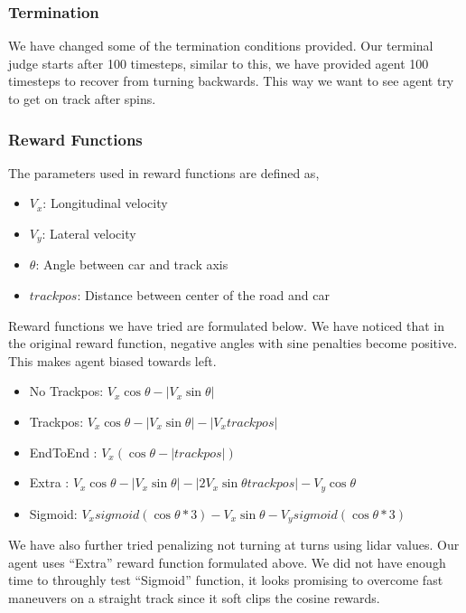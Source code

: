 \documentclass[conference]{IEEEtran}
\begin{document}
\subsubsection{Termination}
We have changed some of the termination conditions provided. Our terminal judge starts after 100 timesteps, similar to this, we have provided agent 100 timesteps to recover from turning backwards. This way we want to see agent try to get on track after spins.

\subsubsection{Reward Functions}
The parameters used in reward functions are defined as,
\begin{itemize}
    \item $V_x$: Longitudinal velocity
    \item $V_y$: Lateral velocity
    \item $\theta$: Angle between car and track axis
    \item $trackpos$: Distance between center of the road and car
\end{itemize}

Reward functions we have tried are formulated below. We have noticed that in the original reward function, negative angles with sine penalties become positive. This makes agent biased towards left.

\begin{itemize}
    \item No Trackpos: $V_x \cos\theta - |V_x \sin\theta|$
    \item Trackpos: $V_x \cos\theta - |V_x \sin\theta| - |V_x trackpos|$
    \item EndToEnd \cite{jaritz2018end}: $V_x (\cos\theta - |trackpos|)$
    \item Extra \cite{deeprltorcs}: $V_x \cos\theta - |V_x\sin\theta| - |2V_x\sin\theta trackpos| - V_y \cos\theta$
    \item Sigmoid: $V_x sigmoid(\cos\theta * 3) - V_x \sin\theta - V_y sigmoid(\cos\theta * 3)$
\end{itemize}

We have also further tried penalizing not turning at turns using lidar values. Our agent uses ``Extra'' reward function formulated above. We did not have enough time to throughly test ``Sigmoid'' function, it looks promising to overcome fast maneuvers on a straight track since it soft clips the cosine rewards.
\end{document}
